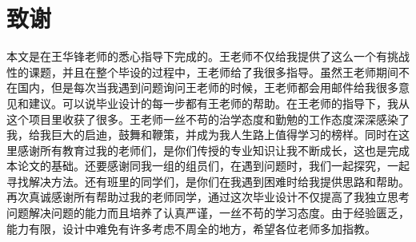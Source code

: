 \chapter*{致谢}
本文是在王华锋老师的悉心指导下完成的。王老师不仅给我提供了这么一个有挑战性的课题，并且在整个毕设的过程中，王老师给了我很多指导。虽然王老师期间不在国内，但是每次当我遇到问题询问王老师的时候，王老师都会用邮件给我很多意见和建议。可以说毕业设计的每一步都有王老师的帮助。在王老师的指导下，我从这个项目里收获了很多。王老师一丝不苟的治学态度和勤勉的工作态度深深感染了我，给我巨大的启迪，鼓舞和鞭策，并成为我人生路上值得学习的榜样。同时在这里感谢所有教育过我的老师们，是你们传授的专业知识让我不断成长，这也是完成本论文的基础。还要感谢同我一组的组员们，在遇到问题时，我们一起探究，一起寻找解决方法。还有班里的同学们，是你们在我遇到困难时给我提供思路和帮助。再次真诚感谢所有帮助过我的老师同学，通过这次毕业设计不仅提高了我独立思考问题解决问题的能力而且培养了认真严谨，一丝不苟的学习态度。由于经验匮乏，能力有限，设计中难免有许多考虑不周全的地方，希望各位老师多加指教。
\cleardoublepage
